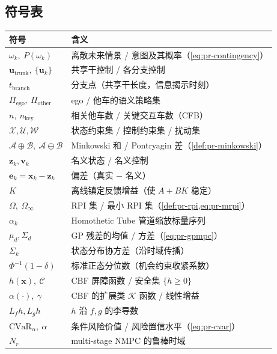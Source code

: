 \subsection*{符号表}
\begin{table}[H]\centering\small
\begin{tabular}{ll}
\toprule
符号 & 含义 \\
\midrule
$\omega_k,\ P(\omega_k)$ & 离散未来情景 / 意图及其概率（\cref{eq:pr-contingency}） \\
$\mathbf{u}_{\mathrm{trunk}},\ \{\mathbf{u}_k\}$ & 共享干控制 / 各分支控制 \\
$t_{\mathrm{branch}}$ & 分支点（共享干长度，信息揭示时刻） \\
$\Pi_{\mathrm{ego}},\ \Pi_{\mathrm{other}}$ & ego / 他车的语义策略集 \\
$n,\ n_{\mathrm{key}}$ & 相关他车数 / 关键交互车数（CFB） \\
$\mathcal{X},\mathcal{U},\mathcal{W}$ & 状态约束集 / 控制约束集 / 扰动集 \\
$\mathcal{A}\oplus\mathcal{B},\ \mathcal{A}\ominus\mathcal{B}$ & Minkowski 和 / Pontryagin 差（\cref{def:pr-minkowski}） \\
$\mathbf{z}_k,\mathbf{v}_k$ & 名义状态 / 名义控制 \\
$\mathbf{e}_k=\mathbf{x}_k-\mathbf{z}_k$ & 偏差（真实 $-$ 名义） \\
$K$ & 离线镇定反馈增益（使 $A+BK$ 稳定） \\
$\Omega,\ \Omega_\infty$ & RPI 集 / 最小 RPI 集（\cref{def:pr-rpi,eq:pr-mrpi}） \\
$\alpha_k$ & Homothetic Tube 管道缩放标量序列 \\
$\mu_d,\Sigma_d$ & GP 残差的均值 / 方差（\cref{eq:pr-gpmpc}） \\
$\Sigma_k$ & 状态分布协方差（沿时域传播） \\
$\Phi^{-1}(1-\delta)$ & 标准正态分位数（机会约束收紧系数） \\
$h(\mathbf{x}),\ \mathcal{C}$ & CBF 屏障函数 / 安全集 $\{h\ge0\}$ \\
$\alpha(\cdot),\ \gamma$ & CBF 的扩展类 $\mathcal{K}$ 函数 / 线性增益 \\
$L_f h,L_g h$ & $h$ 沿 $f,g$ 的李导数 \\
$\mathrm{CVaR}_\alpha,\ \alpha$ & 条件风险价值 / 风险置信水平（\cref{eq:pr-cvar}） \\
$N_r$ & multi-stage NMPC 的鲁棒时域 \\
\bottomrule
\end{tabular}
\end{table}

